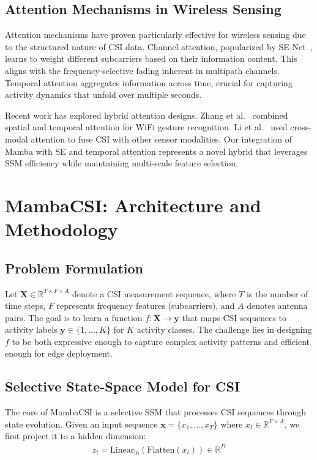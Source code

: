 \documentclass[journal]{IEEEtran}
\begin{document}
\subsection{Attention Mechanisms in Wireless Sensing}

Attention mechanisms have proven particularly effective for wireless sensing due to the structured nature of CSI data. Channel attention, popularized by SE-Net~\cite{hu2018squeeze}, learns to weight different subcarriers based on their information content. This aligns with the frequency-selective fading inherent in multipath channels. Temporal attention aggregates information across time, crucial for capturing activity dynamics that unfold over multiple seconds.

Recent work has explored hybrid attention designs. Zhang et al.~\cite{zhang2023attention} combined spatial and temporal attention for WiFi gesture recognition. Li et al.~\cite{li2024cross} used cross-modal attention to fuse CSI with other sensor modalities. Our integration of Mamba with SE and temporal attention represents a novel hybrid that leverages SSM efficiency while maintaining multi-scale feature selection.

\section{MambaCSI: Architecture and Methodology}

\subsection{Problem Formulation}

Let $\mathbf{X} \in \mathbb{R}^{T \times F \times A}$ denote a CSI measurement sequence, where $T$ is the number of time steps, $F$ represents frequency features (subcarriers), and $A$ denotes antenna pairs. The goal is to learn a function $f: \mathbf{X} \rightarrow \mathbf{y}$ that maps CSI sequences to activity labels $\mathbf{y} \in \{1, ..., K\}$ for $K$ activity classes. The challenge lies in designing $f$ to be both expressive enough to capture complex activity patterns and efficient enough for edge deployment.

\subsection{Selective State-Space Model for CSI}

The core of MambaCSI is a selective SSM that processes CSI sequences through state evolution. Given an input sequence $\mathbf{x} = \{x_1, ..., x_T\}$ where $x_t \in \mathbb{R}^{F \times A}$, we first project it to a hidden dimension:
\begin{align}
z_t = \text{Linear}_{\text{in}}(\text{Flatten}(x_t)) \in \mathbb{R}^D
\end{align}
\end{document}
